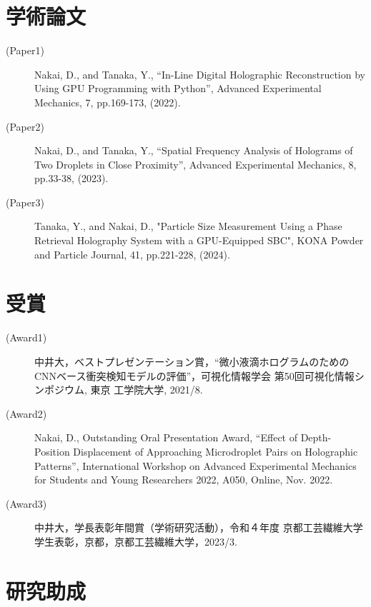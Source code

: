 \section*{学術論文}

\begin{description}
    \item[(Paper1)] Nakai, D., and Tanaka, Y., “In-Line Digital Holographic Reconstruction by Using GPU Programming with Python”, Advanced Experimental Mechanics, 7, pp.169-173, (2022).
    \item[(Paper2)] Nakai, D., and Tanaka, Y., “Spatial Frequency Analysis of Holograms of Two Droplets in Close Proximity”, Advanced Experimental Mechanics, 8, pp.33-38, (2023).
    \item[(Paper3)] Tanaka, Y., and Nakai, D., "Particle Size Measurement Using a Phase Retrieval Holography System with a GPU-Equipped SBC", KONA Powder and Particle Journal, 41, pp.221-228, (2024).
\end{description}
\section*{受賞}
\begin{description}
    \item[(Award1)] 中井大，ベストプレゼンテーション賞，“微小液滴ホログラムのためのCNNベース衝突検知モデルの評価”，可視化情報学会 第50回可視化情報シンポジウム, 東京 工学院大学, 2021/8.
    \item[(Award2)] Nakai, D., Outstanding Oral Presentation Award, “Effect of Depth-Position Displacement of Approaching Microdroplet Pairs on Holographic Patterns”, International Workshop on Advanced Experimental Mechanics for Students and Young Researchers 2022, A050, Online, Nov. 2022.
    \item[(Award3)] 中井大，学長表彰年間賞（学術研究活動），令和４年度 京都工芸繊維大学 学生表彰，京都，京都工芸繊維大学，2023/3.
\end{description}

\section*{研究助成}

